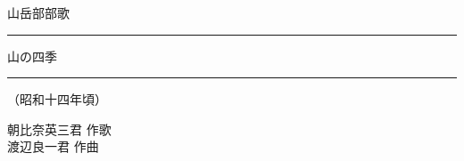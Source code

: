 \documentclass[10pt,b5j]{tarticle} %
\begin{document}
\begin{minipage}[c]{0.7\hsize} %
    \begin{center}
        {\LARGE
            山岳部部歌 %
        }
        {\large 
            \rule[0.0em]{1.0em}{0.05em} 山の四季 \rule[0.0em]{1.0em}{0.05em}
        }
        {\small 
            （昭和十四年頃） %
        }
    \end{center}
\end{minipage}
\begin{minipage}[c]{0.3\hsize} %
    \begin{flushright} %
        朝比奈英三君 作歌\\渡辺良一君 作曲 %
    \end{flushright}
\end{minipage}
\end{document}
